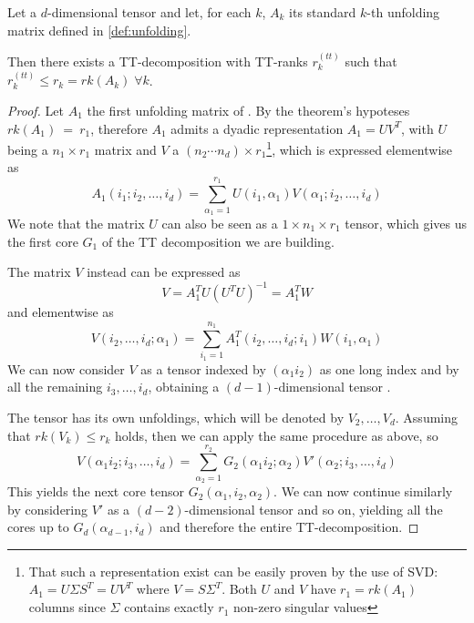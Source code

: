 \begin{Teo} \label{teo:ttsvd}
  Let \A a $d$-dimensional tensor and let, for each $k$, $A_k$ its standard $k$-th unfolding matrix defined in \ref{def:unfolding}.

  Then there exists a TT-decomposition with TT-ranks $r^{(tt)}_k$ such that $r^{(tt)}_k \leq r_k = rk(A_k) \; \forall k$.

  \begin{proof}
    Let $A_1$ the first unfolding matrix of \A. By the theorem's hypoteses $rk(A_1)~=~r_1$, therefore 
    $A_1$ admits a dyadic representation $A_1 = UV^T$, with $U$ being a $n_1 \times r_1$ matrix and $V$ a $(n_2 \cdots n_d) \times r_1$\footnote{That such a representation exist can be easily proven by the use of SVD: $A_1 = U \Sigma S^T = UV^T$ where $V = S \Sigma^T$. Both $U$ and $V$ have $r_1 = rk(A_1)$ columns since $\Sigma$ contains exactly $r_1$ non-zero singular values},
    which is expressed elementwise as
    \begin{equation*}
      A_1(i_1;i_2,\ldots,i_d) = \sum_{\alpha_1 = 1}^{r_1} U(i_1,\alpha_1) V(\alpha_1;i_2,\ldots,i_d)
    \end{equation*}
    We note that the matrix $U$ can also be seen as a $1 \times n_1 \times r_1$ tensor, which gives us the first core $G_1$ of the TT decomposition we are building.

    The matrix $V$ instead can be expressed as
    \begin{equation}\label{eq:Vdecomp}
      V = A_1^T U (U^T U)^{-1} = A_1^T W
    \end{equation}
    and elementwise as
    \begin{equation*}
      V(i_2,\ldots,i_d;\alpha_1) = \sum_{i_1 = 1}^{n_1} A_1^T(i_2,\ldots,i_d;i_1) W(i_1,\alpha_1)
    \end{equation*}
    We can now consider $V$ as a tensor indexed by $(\alpha_1 i_2)$ as one long index and by all the remaining $i_3, \ldots, i_d$, obtaining a $(d-1)$-dimensional tensor \V.

    The tensor \V has its own unfoldings, which will be denoted by $V_2,\ldots,V_d$. Assuming that $rk(V_k) \leq r_k$ holds, then we can apply the same procedure as above, so
    \begin{equation*}
      V(\alpha_1 i_2;i_3,\ldots,i_d) = \sum_{\alpha_2=1}^{r_2} G_2(\alpha_1 i_2;\alpha_2) V'(\alpha_2;i_3,\ldots,i_d)
    \end{equation*}
    This yields the next core tensor $G_2(\alpha_1,i_2,\alpha_2)$.
    We can now continue similarly by considering $V'$ as a $(d-2)$-dimensional tensor and so on, yielding all the cores up to $G_d(\alpha_{d-1},i_d)$ and therefore the entire TT-decomposition.


\end{proof}
\end{Teo}
